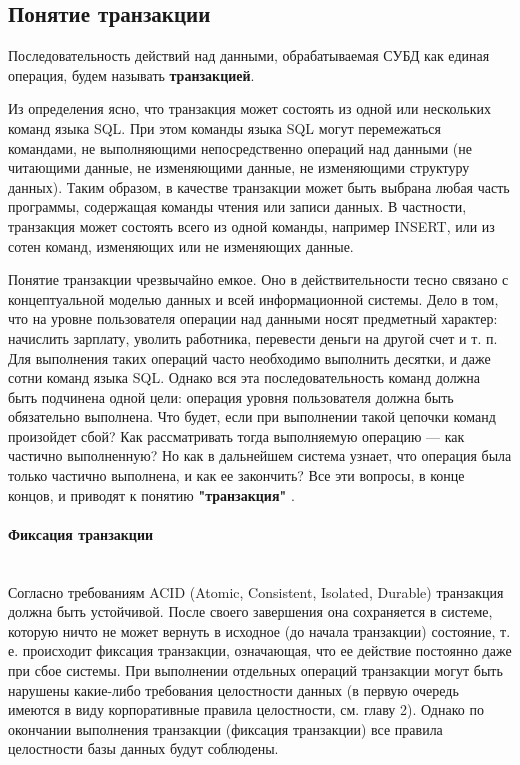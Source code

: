 \subsection{Понятие транзакции}

\begin{grayquote}
    Последовательность действий над данными, обрабатываемая СУБД как единая операция, будем называть \textbf{транзакцией}.
\end{grayquote}

Из определения ясно, что транзакция может состоять из одной или нескольких команд языка SQL. При этом команды языка SQL могут перемежаться командами, не выполняющими непосредственно операций над данными (не читающими данные, не изменяющими данные, не изменяющими структуру данных). Таким образом, в качестве транзакции может быть выбрана любая часть программы, содержащая команды чтения или записи данных. В частности, транзакция может состоять всего из одной команды, например INSERT, или из сотен команд, изменяющих или не изменяющих данные.


Понятие транзакции чрезвычайно емкое. Оно в действительности тесно связано с концептуальной моделью данных и всей информационной системы. Дело в том, что на уровне пользователя операции над данными носят предметный характер: начислить зарплату, уволить работника, перевести деньги на другой счет и т. п. Для выполнения таких операций часто необходимо выполнить десятки, и даже сотни команд языка SQL. Однако вся эта последовательность команд должна быть подчинена одной цели: операция уровня пользователя должна быть обязательно выполнена. Что будет, если при выполнении такой цепочки команд произойдет сбой? Как рассматривать тогда выполняемую операцию — как частично выполненную? Но как в дальнейшем система узнает, что операция была только частично выполнена, и как ее закончить? Все эти вопросы, в конце концов, и приводят к понятию \textbf{"транзакция"} \autocite{Pirogov2009}.


\paragraph{Фиксация транзакции} ~\\

Согласно требованиям ACID (Atomic, Consistent, Isolated, Durable) транзакция должна быть устойчивой. После своего завершения она сохраняется в системе, которую ничто не может вернуть в исходное (до начала транзакции) состояние, т. е. происходит фиксация транзакции, означающая, что ее действие постоянно даже при сбое системы. При выполнении отдельных операций транзакции могут быть нарушены какие-либо требования целостности данных (в первую очередь имеются в виду корпоративные правила целостности, см. главу 2). Однако по окончании выполнения транзакции (фиксация транзакции) все правила целостности базы данных будут соблюдены. \\


